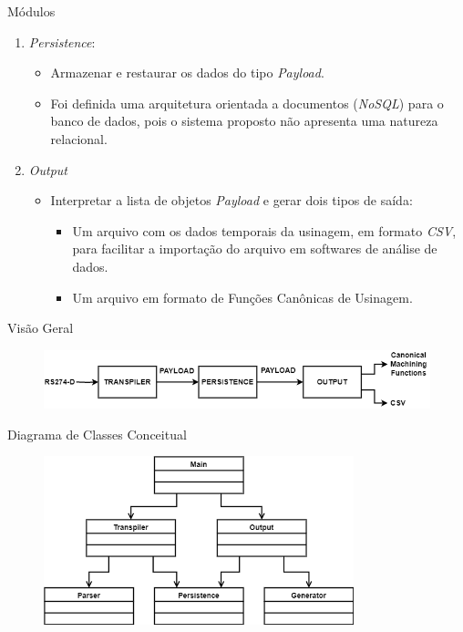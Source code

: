 \documentclass[aspectratio=169]{beamer}
\begin{document}
{\begin{frame}{Módulos}
\begin{enumerate}
    \item {
      \emph{Persistence}:
      \begin{itemize}
        \item Armazenar e restaurar os dados do tipo \emph{Payload}.
        \item Foi definida uma arquitetura orientada a documentos 
              (\emph{NoSQL}) para o banco de dados, pois o sistema 
              proposto não apresenta uma natureza relacional.
      \end{itemize}
    }

    \item {
      \emph{Output}
      \begin{itemize}
        \item Interpretar a lista de objetos \emph{Payload} 
              e gerar dois tipos de saída:
        \begin{itemize}
              \item Um arquivo com os dados temporais da usinagem, 
                    em formato \emph{CSV}, para facilitar a importação 
                    do arquivo em softwares de análise de dados.
              \item Um arquivo em formato de Funções Canônicas de 
                    Usinagem.
        \end{itemize}
      \end{itemize}
    }

  \end{enumerate}
\end{frame}


\begin{frame}{Visão Geral}

  \begin{figure}[H]
    \centering
    \includegraphics[width=\textwidth]{images/idef0-main.png}
  \end{figure}

\end{frame}


\begin{frame}{Diagrama de Classes Conceitual}

  \begin{figure}[H]
    \centering
    \includegraphics[width=90mm]{images/class-main.png}
  \end{figure}


\end{frame}}
\end{document}
